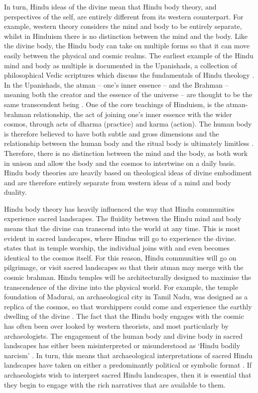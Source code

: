 	 In turn, Hindu ideas of the divine mean that Hindu body theory, and perspectives of the self, are entirely different from its western counterpart. For example, western theory considers the mind and body to be entirely separate, whilst in Hinduism there is no distinction between the mind and the body. Like the divine body, the Hindu body can take on multiple forms so that it can move easily between the physical and cosmic realms. The earliest example of the Hindu mind and body as multiple is documented in the Upanishads, a collection of philosophical Vedic scriptures which discuss the fundamentals of Hindu theology \parencite [33] {Patrick_1998}. In the Upanishads, the atman – one’s inner essence – and the Brahman – meaning both the creator and the essence of the universe – are thought to be the same transcendent being \parencite [61] {Staal_1993}. One of the core teachings of Hinduism, is the atman-brahman relationship, the act of joining one’s inner essence with the wider cosmos, through acts of dharma (practice) and karma (action). The human body is therefore believed to have both subtle and gross dimensions and the relationship between the human body and the ritual body is ultimately limitless \parencite {Holdrege_2007}. Therefore, there is no distinction between the mind and the body, as both work in unison and allow the body and the cosmos to intertwine on a daily basis. Hindu body theories are heavily based on theological ideas of divine embodiment and are therefore entirely separate from western ideas of a mind and body duality.

	 Hindu body theory has heavily influenced the way that Hindu communities experience sacred landscapes. The fluidity between the Hindu mind and body means that the divine can transcend into the world at any time. This is most evident in sacred landscapes, where Hindus will go to experience the divine. \textcite[214]{Beck_1976} states that in temple worship, the individual joins with and even becomes identical to the cosmos itself. For this reason, Hindu communities will go on pilgrimage, or visit sacred landscapes so that their atman may merge with the cosmic brahman. Hindu temples will be architecturally designed to maximise the transcendence of the divine into the physical world. For example, the temple foundation of Madurai, an archaeological city in Tamil Nadu, was designed as a replica of the cosmos, so that worshippers could come and experience the earthly dwelling of the divine \parencite [236] {Beck_1976}. The fact that the Hindu body engages with the cosmic has often been over looked by western theorists, and most particularly by archaeologists. The engagement of the human body and divine body in sacred landscapes has either been misinterpreted or misunderstood as ‘Hindu bodily narcism’ \parencite [55] {Smith_1989}. In turn, this means that archaeological interpretations of sacred Hindu landscapes have taken on either a predominantly political or symbolic format \parencites{Fritz_1986}{Mack_2004}{Sinopoli_2010}. If archaeologists wish to interpret sacred Hindu landscapes, then it is essential that they begin to engage with the rich narratives that are available to them.
	 
